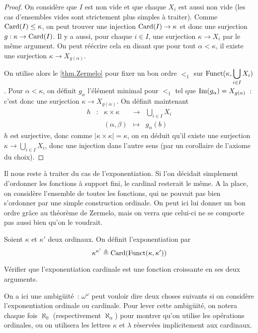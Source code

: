 \begin{proof}
  On considère que $I$ est non vide et que chaque $X_i$ est aussi non vide
  (les cas d'ensembles vides sont strictement plus simples à traiter). Comme
  $\operatorname{Card}(I) \leq \kappa$, on peut trouver une injection $\operatorname{Card}(I) \to \kappa$
  et donc une surjection $g : \kappa \to \operatorname{Card}(I)$. Il y a aussi, pour chaque
  $i \in I$, une surjection $\kappa \to X_i$ par le même argument. On peut
  réécrire cela en disant que pour tout $\alpha < \kappa$, il existe une
  surjection $\kappa \to X_{g(\alpha)}$.

  On utilise alors le \cref{thm.Zermelo} pour fixer un bon ordre $<_1$ sur
  $\displaystyle\operatorname{Funct}(\kappa,\bigcup_{i \in I} X_i)$. Pour $\alpha < \kappa$,
  on définit $g_\alpha$ l'élément minimal pour $<_1$ tel que
  $\operatorname{Im}(g_\alpha) = X_{g(\alpha)}$~: c'est donc une surjection
  $\kappa\to X_{g(\alpha)}$. On définit maintenant
  \[\begin{array}{ccccc}
  h & : & \kappa \times \kappa & \longrightarrow & \bigcup_{i \in I} X_i\\
  & & (\alpha, \beta) &\longmapsto & g_\alpha(b)
  \end{array}\]
  $h$ est surjective, donc comme $|\kappa \times \kappa| = \kappa$, on en
  déduit qu'il existe une surjection
  $\displaystyle\kappa \to \bigcup_{i \in I} X_i$, donc une injection dans l'autre
  sens (par un corollaire de l'axiome du choix).
\end{proof}

Il nous reste à traiter du cas de l'exponentiation. Si l'on décidait simplement
d'ordonner les fonctions à support fini, le cardinal resterait le même. A la
place, on considère l'ensemble de toutes les fonctions, qui ne pouvait pas
bien s'ordonner par une simple construction ordinale. On peut ici lui donner
un bon ordre grâce au théorème de Zermelo, mais on verra que celui-ci ne se
comporte pas aussi bien qu'on le voudrait.

\begin{definition}
  Soient $\kappa$ et $\kappa'$ deux ordinaux. On définit l'exponentiation
  par
  \[\kappa^{\kappa'} \triangleq \operatorname{Card}(\operatorname{Funct}(\kappa,\kappa'))\]
\end{definition}

\begin{exercise}
  Vérifier que l'exponentiation cardinale est une fonction croissante en ses
  deux arguments.
\end{exercise}

\begin{notation}
  On a ici une ambigüité~: $\omega^\omega$ peut vouloir dire deux choses
  suivants si on considère l'exponentiation ordinale ou cardinale. Pour lever
  cette ambigüité, on notera chaque fois $\aleph_0$ (respectivement
  $\aleph_\alpha$) pour montrer qu'on utilise les opérations ordinales, ou on
  utilisera les lettres $\kappa$ et $\lambda$ réservées implicitement aux
  cardinaux.
\end{notation}

